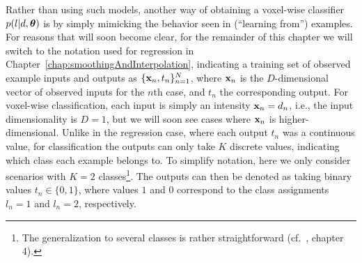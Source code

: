 \documentclass[10pt,twoside]{book}
\begin{document}
Rather than 
using such models,
another way of obtaining a voxel-wise classifier $p( l | d, {\mbox{\boldmath {${\theta}$}}} )$ 
is by 
simply mimicking the 
behavior
seen in
(``learning from'') examples.
For reasons that will soon become clear, 
for the remainder of this chapter
we will switch to the notation used for regression in Chapter~\ref{chap:smoothingAndInterpolation},
indicating a training set of observed example inputs and outputs as $\{\mathbf{x}_n, t_n\}_{n=1}^N$, where $\mathbf{x}_n$ is the $D$-dimensional vector of observed inputs for the $n$th case, and $t_n$ the corresponding output.
For voxel-wise classification, 
each input is simply an intensity
$\mathbf{x}_n = d_n$, 
i.e., the input dimensionality is $D=1$,
but we will soon see cases where $\mathbf{x}_n$ is 
higher-dimensional.
Unlike in the regression case, where each output $t_n$ was a continuous value, 
for classification the outputs can only take 
$K$
discrete values, indicating which class 
each
example belongs to.
To simplify notation, here we only consider scenarios with $K=2$ classes\footnote{The generalization to several classes is rather straightforward (cf.~\cite{bishop2006pattern}, chapter 4).}.
The outputs can then be denoted as taking binary values $t_n \in \{0,1\}$, 
where 
values $1$ and $0$ 
correspond to the class assignments
$l_n=1$ and $l_n=2$, respectively.
\end{document}
